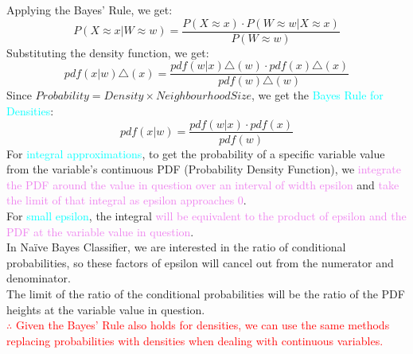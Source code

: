 \documentclass{book}
\begin{document}
Applying the Bayes' Rule, we get:
\[
    P(X \approx x|W \approx w) = \frac{P(X \approx x) \cdot P(W \approx w|X \approx x)}{P(W \approx w)}
\]
Substituting the density function, we get:
\[
    pdf(x|w)\triangle(x) = \frac{pdf(w|x)\triangle(w)\cdot pdf(x)\triangle(x)}{pdf(w)\triangle(w)}
\]
Since \(Probability = Density \times NeighbourhoodSize\), we get the \textcolor{cyan}{Bayes Rule for Densities}:
\[
    pdf(x|w) = \frac{pdf(w|x) \cdot pdf(x)}{pdf(w)}
\]
For \textcolor{cyan}{integral approximations}, to get the probability of a specific variable value from the variable's continuous PDF (Probability Density Function), we \textcolor{violet}{integrate the PDF around the value in question over an interval of width epsilon} and \textcolor{violet}{take the limit of that integral as epsilon approaches 0}.\\
For \textcolor{cyan}{small epsilon}, the integral \textcolor{violet}{will be equivalent to the product of epsilon and the PDF at the variable value in question}.\\
In Naïve Bayes Classifier, we are interested in the ratio of conditional probabilities, so these factors of epsilon will cancel out from the numerator and denominator.\\
The limit of the ratio of the conditional probabilities will be the ratio of the PDF heights at the variable value in question.\\
\vspace{2mm}
\textcolor{red}{$\therefore$ Given the Bayes' Rule also holds for densities, we can use the same methods replacing probabilities with densities when dealing with continuous variables.}\\
\end{document}
